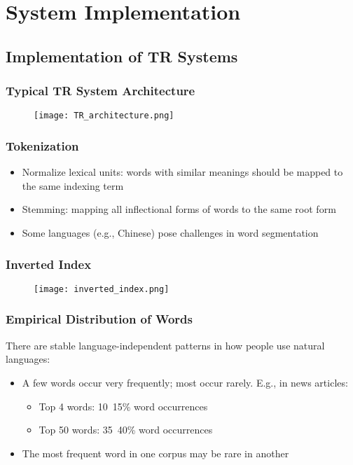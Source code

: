 \newpage
\section{System Implementation}

\subsection{Implementation of TR Systems}

\subsubsection{Typical TR System Architecture}
\begin{figure}[H]
    \centering
    \texttt{[image: TR\_architecture.png]}
\end{figure}

\subsubsection{Tokenization}
\begin{itemize}
\item Normalize lexical units: words with similar meanings should be mapped to the same indexing term
\item Stemming: mapping all inflectional forms of words to the same root form
\item Some languages (e.g., Chinese) pose challenges in word segmentation
\end{itemize}

\subsubsection{Inverted Index}
\begin{figure}[H]
    \centering
    \texttt{[image: inverted\_index.png]}
\end{figure}


\subsubsection{Empirical Distribution of Words}
There are stable language-independent patterns in how people use natural languages:
\begin{itemize}
\item A few words occur very frequently; most occur rarely. E.g., in news articles:
\begin{itemize}
\item Top 4 words: 10~15\% word occurrences 
\item Top 50 words: 35~40\% word occurrences
\end{itemize}
\item The most frequent word in one corpus may be rare in another
\end{itemize}


